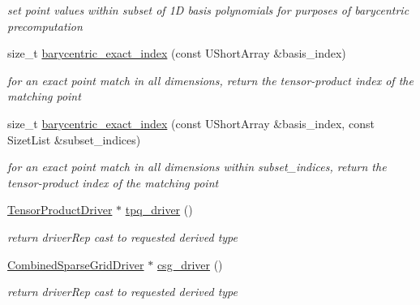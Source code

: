 \begin{DoxyCompactItemize}
\begin{DoxyCompactList}\small\item\em set point values within subset of 1D basis polynomials for purposes of barycentric precomputation \end{DoxyCompactList}\item 
size\+\_\+t \hyperlink{classPecos_1_1SharedNodalInterpPolyApproxData_a7c23d0f2145a4a2ad61fa7f6f2feb13e}{barycentric\+\_\+exact\+\_\+index} (const U\+Short\+Array \&basis\+\_\+index)\label{classPecos_1_1SharedNodalInterpPolyApproxData_a7c23d0f2145a4a2ad61fa7f6f2feb13e}

\begin{DoxyCompactList}\small\item\em for an exact point match in all dimensions, return the tensor-\/product index of the matching point \end{DoxyCompactList}\item 
size\+\_\+t \hyperlink{classPecos_1_1SharedNodalInterpPolyApproxData_ac30b80dcedaab190a93a5c381ca1468d}{barycentric\+\_\+exact\+\_\+index} (const U\+Short\+Array \&basis\+\_\+index, const Sizet\+List \&subset\+\_\+indices)\label{classPecos_1_1SharedNodalInterpPolyApproxData_ac30b80dcedaab190a93a5c381ca1468d}

\begin{DoxyCompactList}\small\item\em for an exact point match in all dimensions within subset\+\_\+indices, return the tensor-\/product index of the matching point \end{DoxyCompactList}\item 
\hyperlink{classPecos_1_1TensorProductDriver}{Tensor\+Product\+Driver} $\ast$ \hyperlink{classPecos_1_1SharedNodalInterpPolyApproxData_aecf09ae2f3421803794fffa2ddc779a9}{tpq\+\_\+driver} ()\label{classPecos_1_1SharedNodalInterpPolyApproxData_aecf09ae2f3421803794fffa2ddc779a9}

\begin{DoxyCompactList}\small\item\em return driver\+Rep cast to requested derived type \end{DoxyCompactList}\item 
\hyperlink{classPecos_1_1CombinedSparseGridDriver}{Combined\+Sparse\+Grid\+Driver} $\ast$ \hyperlink{classPecos_1_1SharedNodalInterpPolyApproxData_a318d97dbe0d8d4293d996be0fd6df99a}{csg\+\_\+driver} ()\label{classPecos_1_1SharedNodalInterpPolyApproxData_a318d97dbe0d8d4293d996be0fd6df99a}

\begin{DoxyCompactList}\small\item\em return driver\+Rep cast to requested derived type \end{DoxyCompactList}\end{DoxyCompactItemize}
